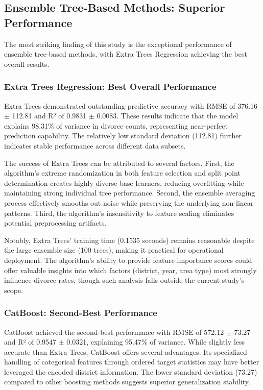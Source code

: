 \subsection{Ensemble Tree-Based Methods: Superior Performance}

The most striking finding of this study is the exceptional performance of ensemble tree-based methods, with Extra Trees Regression achieving the best overall results.

\subsubsection{Extra Trees Regression: Best Overall Performance}

Extra Trees demonstrated outstanding predictive accuracy with RMSE of 376.16 $\pm$ 112.81 and R² of 0.9831 $\pm$ 0.0083. These results indicate that the model explains 98.31\% of variance in divorce counts, representing near-perfect prediction capability. The relatively low standard deviation (112.81) further indicates stable performance across different data subsets.

The success of Extra Trees can be attributed to several factors. First, the algorithm's extreme randomization in both feature selection and split point determination creates highly diverse base learners, reducing overfitting while maintaining strong individual tree performance. Second, the ensemble averaging process effectively smooths out noise while preserving the underlying non-linear patterns. Third, the algorithm's insensitivity to feature scaling eliminates potential preprocessing artifacts.

Notably, Extra Trees' training time (0.1535 seconds) remains reasonable despite the large ensemble size (100 trees), making it practical for operational deployment. The algorithm's ability to provide feature importance scores could offer valuable insights into which factors (district, year, area type) most strongly influence divorce rates, though such analysis falls outside the current study's scope.

\subsubsection{CatBoost: Second-Best Performance}

CatBoost achieved the second-best performance with RMSE of 572.12 $\pm$ 73.27 and R² of 0.9547 $\pm$ 0.0321, explaining 95.47\% of variance. While slightly less accurate than Extra Trees, CatBoost offers several advantages. Its specialized handling of categorical features through ordered target statistics may have better leveraged the encoded district information. The lower standard deviation (73.27) compared to other boosting methods suggests superior generalization stability.

